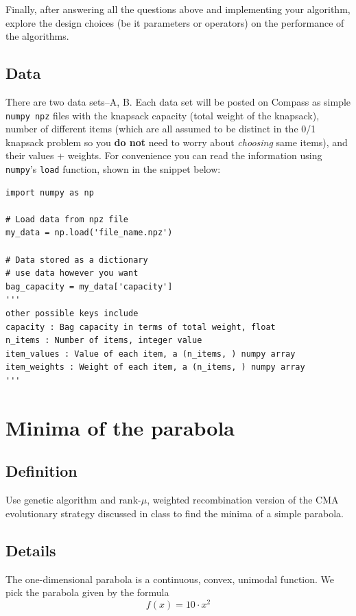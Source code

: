 \documentclass[11pt]{article}
\begin{document}
Finally, after answering all the questions above and implementing your
algorithm, explore the design choices (be it parameters or operators) on the
performance of the algorithms.
\subsection{Data}
\label{sec:data}
There are two data sets--A, B. Each data set will be posted on Compass as
simple \texttt{numpy npz} files with the knapsack capacity (total weight of the
knapsack), number of different items (which are all assumed to be distinct in
the 0/1 knapsack problem so you \textbf{do not} need to worry about \emph{choosing} same
items), and their values + weights. For convenience you can read the
information using \texttt{numpy}'s \texttt{load} function, shown in the snippet below:

\begin{verbatim}
import numpy as np

# Load data from npz file
my_data = np.load('file_name.npz')

# Data stored as a dictionary
# use data however you want
bag_capacity = my_data['capacity']
'''
other possible keys include
capacity : Bag capacity in terms of total weight, float
n_items : Number of items, integer value
item_values : Value of each item, a (n_items, ) numpy array
item_weights : Weight of each item, a (n_items, ) numpy array
'''

\end{verbatim}

\section{Minima of the parabola}
\label{sec:org6e0ca6d}
\subsection{Definition}
\label{sec:org9f18b34}
  Use genetic algorithm and rank-\(\mu\), weighted recombination version of the CMA
evolutionary strategy discussed in class to find the minima of a simple parabola.
\subsection{Details}
\label{sec:org79fec33}
The one-dimensional parabola is a continuous, convex, unimodal function. We
pick the parabola given by the formula
\begin{equation}
f(x) = 10 \cdot x^2
\end{equation}
\end{document}
